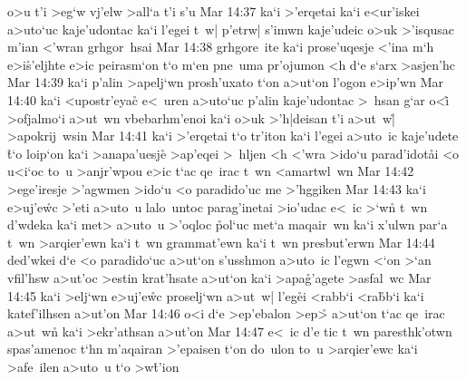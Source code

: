 o>u
t'i
>eg`w
vj'elw
>all`a
t'i
s'u\bibvsend
\vs Mar 14:37
ka`i
>'erqetai
ka`i
e<ur'iskei
a>uto`uc
kaje'udontac
ka`i
l'egei
t~w|
p'etrw|
s'imwn
kaje'udeic
o>uk
>'isqusac
m'ian
<'wran
grhgor~hsai\bibvsend
\vs Mar 14:38
grhgore~ite
ka`i
prose'uqesje
<'ina
m`h
e>i\r{s}'eljhte
e>ic
peirasm`on
t`o
m`en
pne~uma
pr'ojumon
<h
d`e
s`arx
>asjen'hc\bibvsend
\vs Mar 14:39
ka`i
p'alin
>apelj`wn
prosh'uxato
t`on
a>ut`on
l'ogon
e>ip'wn\bibvsend
\vs Mar 14:40
ka`i
<upostr'eyac\r{}
e<~uren
a>uto`uc
p'alin
kaje'udontac
>~hsan
g`ar
o<i\r{}
>ofjalmo`i
a>ut~wn
vbebarhm'enoi
ka`i
o>uk
>'h|deisan
t'i
a>ut~w|\r{}
>apokrij~wsin\bibvsend
\vs Mar 14:41
ka`i
>'erqetai
t`o
tr'iton
ka`i
l'egei
a>uto~ic
kaje'udete
\r{t}`o
loip`on
ka`i
>anapa'uesje\r{}
>ap'eqei
>~hljen
<h
<'wra
>ido`u
parad'idot\r{a}i
<o
u<i`oc
to~u
>anjr'wpou
e>ic
t`ac
qe~irac
t~wn
<amartwl~wn\bibvsend
\vs Mar 14:42
>ege'iresje
>'agwmen
>ido`u
<o
paradido'uc
me
>'hggiken\bibvsend
\vs Mar 14:43
ka`i
e>uj'e\r{w}c
>'eti
a>uto~u
lalo~untoc
parag'inetai
>io'udac
e<~ic
>`w\r{n}
t~wn
d'wdeka
ka`i
met>
a>uto~u
>'oqloc
\r{p}ol`uc
met`a
maqair~wn
ka`i
x'ulwn
par`a
t~wn
>arqier'ewn
ka`i
t~wn
grammat'ewn
ka`i
t~wn
presbut'erwn\bibvsend
\vs Mar 14:44
ded'wkei
d`e
<o
paradido`uc
a>ut`on
s'usshmon
a>uto~ic
l'egwn
<`on
>`an
vfil'hsw
a>ut'oc
>estin
krat'hsate
a>ut`on
ka`i
>apa\r{g}'agete
>asfal~wc\bibvsend
\vs Mar 14:45
ka`i
>elj`wn
e>uj'e\r{w}c
proselj`wn
a>ut~w|
l'eg\r{e}i
<rabb`i
<ra\r{b}b`i
ka`i
katef'ilhsen
a>ut'on\bibvsend
\vs Mar 14:46
o<i
d`e
>ep'ebalon
>ep>\r{}
a>ut`on
t`ac
qe~irac
a>ut~w\r{n}
ka`i
>ekr'athsan
a>ut'on\bibvsend
\vs Mar 14:47
e<~ic
d'e
tic
t~wn
paresthk'otwn
spas'amenoc
t`hn
m'aqairan
>'epaisen
t`on
do~ulon
to~u
>arqier'ewc
ka`i
>afe~ilen
a>uto~u
t`o
>w\r{t}'ion\bibvsend
{}
